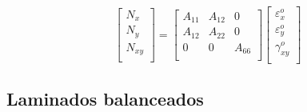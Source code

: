 \begin{equation} \label{eq_result_loadingA}
\begin{bmatrix}
    N_{x} \\
    N_{y} \\
    N_{xy} \\
\end{bmatrix}
=
\begin{bmatrix}
    A_{11} & A_{12} & 0\\
    A_{12} & A_{22} & 0\\
    0 & 0 & A_{66}\\
\end{bmatrix}
\begin{bmatrix}
    \varepsilon_{x}^o \\
    \varepsilon_{y}^o \\
    \gamma_{xy}^o \\
\end{bmatrix}
\end{equation}
 
\subsection{Laminados balanceados}
